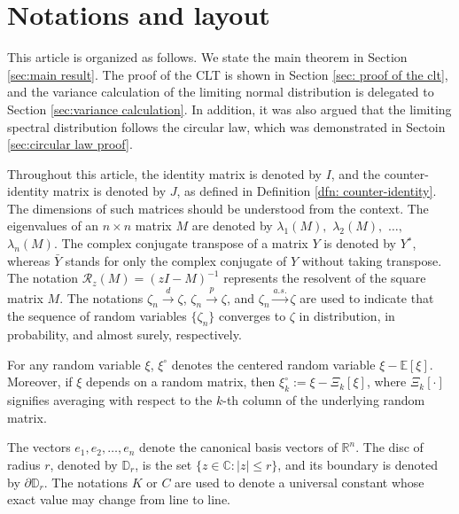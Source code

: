 \documentclass[12pt]{amsart}
\theoremstyle{plain}
\theoremstyle{definition}
\newcommand{\conjugate}{{\operatorname{^*}}}
\begin{document}
\section{Notations and layout}

This article is organized as follows. We state the main theorem in Section \ref{sec:main result}. The proof of the CLT is shown in Section \ref{sec: proof of the clt}, and the variance calculation of the limiting normal distribution is delegated to Section \ref{sec:variance calculation}. In addition, it was also argued that the limiting spectral distribution follows the circular law, which was demonstrated in Sectoin \ref{sec:circular law proof}.

Throughout this article, the identity matrix is denoted by $I$, and the counter-identity matrix is denoted by $J$, as defined in Definition \ref{dfn: counter-identity}. The dimensions of such matrices should be understood from the context. The eigenvalues of an $n\times n$ matrix $M$ are denoted by $\lambda_{1}(M),$  $\lambda_{2}(M),$ $\ldots,$ $\lambda_{n}(M).$ The complex conjugate transpose of a matrix $Y$ is denoted by $Y\conjugate$, whereas $\bar{Y}$ stands for only the complex conjugate of $Y$ without taking transpose. The notation $\mathcal{R}_{z}(M)=(zI-M)^{-1}$ represents the resolvent of the square matrix $M$. The notations $\zeta_{n}\stackrel{d}{\to}\zeta$, $\zeta_{n}\stackrel{p}{\to}\zeta$, and $\zeta_{n}\stackrel{a.s.}{\to}\zeta$ are used to indicate that the sequence of random variables $\{\zeta_{n}\}$ converges to $\zeta$ in distribution, in probability, and almost surely, respectively.

For any random variable $\xi$, $\xi^{\circ}$ denotes the centered random variable $\xi-\mathbb{E}[\xi].$ Moreover, if $\xi$ depends on a random matrix, then $\xi_{k}^{\circ}:=\xi-\Xi_{k}[\xi]$, where $\Xi_{k}[\cdot]$ signifies averaging with respect to the $k$-th column of the underlying random matrix.

The vectors $e_{1}, e_{2}, \ldots, e_{n}$ denote the canonical basis vectors of $\mathbb{R}^{n}.$ The disc of radius $r$, denoted by $\mathbb{D}_{r}$, is the set $\{z\in \mathbb{C}:|z|\leq r\}$, and its boundary is denoted by $\partial \mathbb{D}_{r}$. The notations $K$ or $C$ are used to denote a universal constant whose exact value may change from line to line.

\end{document}

